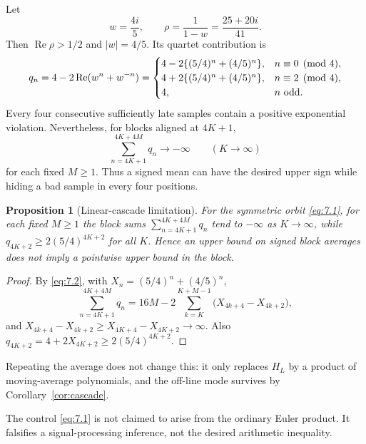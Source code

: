 \documentclass[11pt]{amsart}
\numberwithin{equation}{section}
\newtheorem{proposition}[theorem]{Proposition}
\theoremstyle{definition}
\theoremstyle{remark}
\renewcommand{\Re}{\operatorname{Re}}
\begin{document}
Let
\begin{equation}
 w=\frac{4i}{5},\qquad
 \rho=\frac1{1-w}=\frac{25+20i}{41}.                    \label{eq:7.1}
\end{equation}
Then \(\Re\rho>1/2\) and \(|w|=4/5\). Its quartet contribution is
\begin{equation}
 q_n=4-2\Re(w^n+w^{-n})
 =\begin{cases}
 4-2\{(5/4)^n+(4/5)^n\},&n\equiv0\pmod4,\\
 4+2\{(5/4)^n+(4/5)^n\},&n\equiv2\pmod4,\\
 4,&n\ {\rm odd}.
 \end{cases}                                            \label{eq:7.2}
\end{equation}
Every four consecutive sufficiently late samples contain a positive
exponential violation. Nevertheless, for blocks aligned at \(4K+1\),
\begin{equation}
 \sum_{n=4K+1}^{4K+4M}q_n\longrightarrow-\infty
 \qquad(K\to\infty)                                     \label{eq:7.3}
\end{equation}
for each fixed \(M\ge1\). Thus a signed mean can have the desired upper
sign while hiding a bad sample in every four positions.

\begin{proposition}[Linear-cascade limitation]
\label{prop:linear-limit}
For the symmetric orbit \eqref{eq:7.1}, for each fixed \(M\ge1\) the block
sums \(\sum_{n=4K+1}^{4K+4M}q_n\) tend to \(-\infty\) as \(K\to\infty\),
while \(q_{4K+2}\ge2(5/4)^{4K+2}\) for all \(K\). Hence an upper bound on
signed block averages does not imply a pointwise upper bound in the block.
\end{proposition}

\begin{proof}
By \eqref{eq:7.2}, with \(X_n=(5/4)^n+(4/5)^n\),
\[
 \sum_{n=4K+1}^{4K+4M}q_n
 =16M-2\sum_{k=K}^{K+M-1}\bigl(X_{4k+4}-X_{4k+2}\bigr),
\]
and \(X_{4k+4}-X_{4k+2}\ge X_{4K+4}-X_{4K+2}\to\infty\). Also
\(q_{4K+2}=4+2X_{4K+2}\ge2(5/4)^{4K+2}\).
\end{proof}

Repeating the average does not change this: it only replaces \(H_L\) by a
product of moving-average polynomials, and the off-line mode survives by
Corollary~\ref{cor:cascade}.

The control \eqref{eq:7.1} is not claimed to arise from the ordinary Euler
product. It falsifies a signal-processing inference, not the desired
arithmetic inequality.
\end{document}
